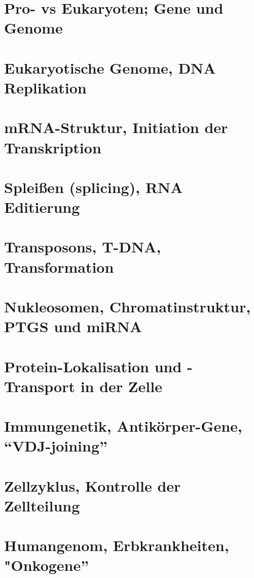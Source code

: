     \chapter{Pro- vs Eukaryoten; Gene und Genome}
    

    \chapter{Eukaryotische Genome, DNA Replikation}
    

    \chapter{mRNA-Struktur, Initiation der Transkription}
    

    \chapter{Spleißen (splicing), RNA Editierung}
    

    \chapter{Transposons, T-DNA, Transformation}
    

    \chapter{Nukleosomen, Chromatinstruktur, PTGS und miRNA}
    

    \chapter{Protein-Lokalisation und -Transport in der Zelle}
    

    \chapter{Immungenetik, Antikörper-Gene, ``VDJ-joining''}
    

    \chapter{Zellzyklus, Kontrolle der Zellteilung}
    

    \chapter{Humangenom, Erbkrankheiten, "Onkogene”}
    
